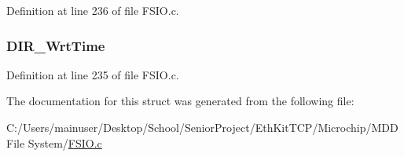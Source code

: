 Definition at line 236 of file F\+S\+I\+O.\+c.

\hypertarget{struct___d_i_r_e_n_t_r_y_a8aae2bce5f7e9091d69dd62e67108559}{}
\subsubsection[{D\+I\+R\+\_\+\+Wrt\+Time}]{ D\+I\+R\+\_\+\+Wrt\+Time}\label{struct___d_i_r_e_n_t_r_y_a8aae2bce5f7e9091d69dd62e67108559}


Definition at line 235 of file F\+S\+I\+O.\+c.



The documentation for this struct was generated from the following file\+:\begin{DoxyCompactItemize}
\item 
C\+:/\+Users/mainuser/\+Desktop/\+School/\+Senior\+Project/\+Eth\+Kit\+T\+C\+P/\+Microchip/\+M\+D\+D File System/\hyperlink{_f_s_i_o_8c}{F\+S\+I\+O.\+c}\end{DoxyCompactItemize}
